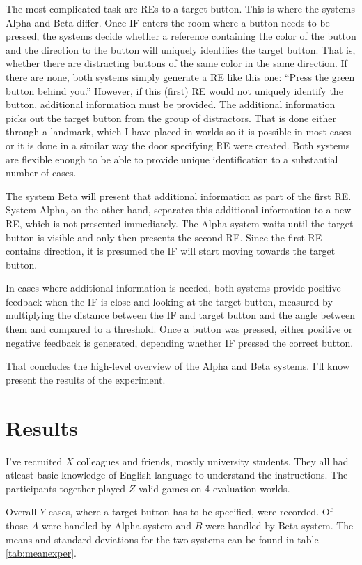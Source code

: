 The most complicated task are REs to a target button. This is where the systems Alpha and Beta differ. Once IF enters the room where a button needs to be pressed, the systems decide whether a reference containing the color of the button and the direction to the button will uniquely identifies the target button. That is, whether there are distracting buttons of the same color in the same direction. If there are none, both systems simply generate a RE like this one: ``Press the green button behind you.'' However, if this (first) RE would not uniquely identify the button, additional information must be provided. The additional information picks out the target button from the group of distractors. That is done either through a landmark, which I have placed in worlds so it is possible in most cases or it is done in a similar way the door specifying RE were created. Both systems are flexible enough to be able to provide unique identification to a substantial number of cases.

The system Beta will present that additional information as part of the first RE. System Alpha, on the other hand, separates this additional information to a new RE, which is not presented immediately. The Alpha system waits until the target button is visible and only then presents the second RE. Since the first RE contains direction, it is presumed the IF will start moving towards the target button.

In cases where additional information is needed, both systems provide positive feedback when the IF is close and looking at the target button, measured by multiplying the distance between the IF and target button and the angle between them and compared to a threshold. Once a button was pressed, either positive or negative feedback is generated, depending whether IF pressed the correct button.

That concludes the high-level overview of the Alpha and Beta systems. I'll know present the results of the experiment.

\section{Results}
I've recruited $X$ colleagues and friends, mostly university students. They all had atleast basic knowledge of English language to understand the instructions. The participants together played $Z$ valid games on 4 evaluation worlds.

Overall $Y$ cases, where a target button has to be specified, were recorded. Of those $A$ were handled by Alpha system and $B$ were handled by Beta system. The means and standard deviations for the two systems can be found in table \ref{tab:meanexper}.

